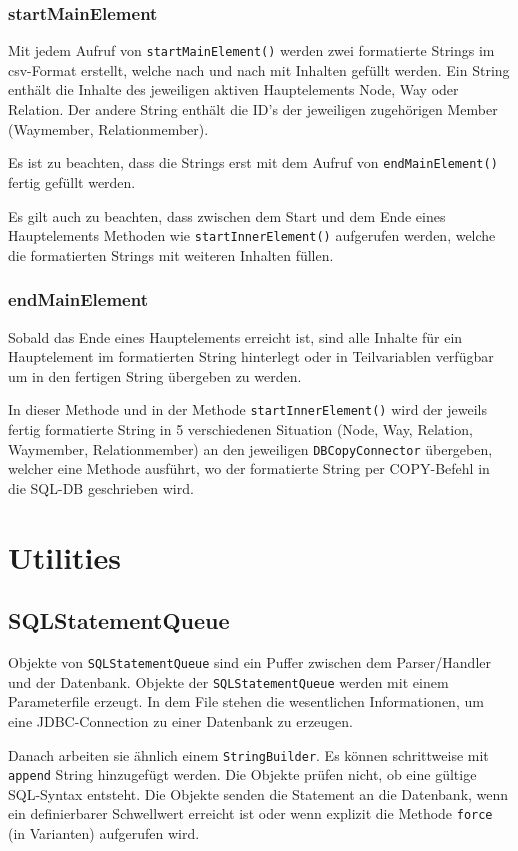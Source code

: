 \subsubsection{startMainElement}
Mit jedem Aufruf von {\tt startMainElement()} werden zwei formatierte Strings im csv-Format erstellt, welche nach und nach mit Inhalten gefüllt werden. Ein String enthält die Inhalte des jeweiligen aktiven Hauptelements Node, Way oder Relation. Der andere String enthält die ID's der jeweiligen zugehörigen Member (Waymember, Relationmember).

Es ist zu beachten, dass die Strings erst mit dem Aufruf von {\tt endMainElement()} fertig gefüllt werden.

Es gilt auch zu beachten, dass zwischen dem Start und dem Ende eines Hauptelements Methoden wie {\tt startInnerElement()} aufgerufen werden, welche die formatierten Strings mit weiteren Inhalten füllen.

\subsubsection{endMainElement}
Sobald das Ende eines Hauptelements erreicht ist, sind alle Inhalte für ein Hauptelement im formatierten String hinterlegt oder in Teilvariablen verfügbar um in den fertigen String übergeben zu werden.

In dieser Methode und in der Methode {\tt startInnerElement()} wird der jeweils fertig formatierte String in 5 verschiedenen Situation (Node, Way, Relation, Waymember, Relationmember) an den jeweiligen {\tt DBCopyConnector} übergeben, welcher eine Methode ausführt, wo der formatierte String per COPY-Befehl in die SQL-DB geschrieben wird.


\section{Utilities}
\subsection{SQLStatementQueue}
\label{SQLStatementQueue}
Objekte von {\tt SQLStatementQueue} sind ein Puffer zwischen dem Parser/Handler und
der Datenbank. Objekte der {\tt SQLStatementQueue} werden mit einem Parameterfile erzeugt.
In dem File stehen die wesentlichen Informationen, um eine JDBC-Connection zu einer Datenbank
zu erzeugen.

Danach arbeiten sie ähnlich einem {\tt StringBuilder}. Es können schrittweise mit {\tt append}
String hinzugefügt werden. Die Objekte prüfen nicht, ob eine gültige SQL-Syntax entsteht.
Die Objekte senden die Statement an die Datenbank, wenn ein definierbarer Schwellwert erreicht
ist oder wenn explizit die Methode {\tt force} (in Varianten) aufgerufen wird.

